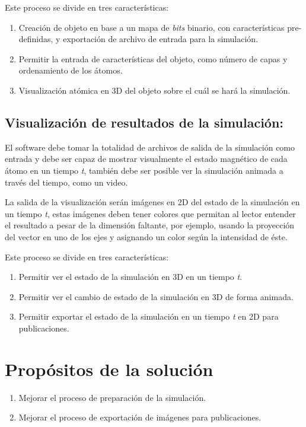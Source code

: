 Este proceso se divide en tres características:

\begin{enumerate}
	\item Creación de objeto en base a un mapa de \emph{bits} binario, con características pre-definidas, y exportación de archivo de entrada para la simulación.
	\item Permitir la entrada de características del objeto, como número de capas y ordenamiento de los átomos.
	\item Visualización atómica en 3D del objeto sobre el cuál se hará la simulación.
\end{enumerate}

\subsection{Visualización de resultados de la simulación:}

El software debe tomar la totalidad de archivos de salida de la simulación como entrada y debe ser capaz de mostrar visualmente el estado magnético de cada átomo en un tiempo \emph{t}, también debe ser posible ver la simulación animada a través del tiempo, como un video.

La salida de la visualización serán imágenes en 2D del estado de la simulación en un tiempo \emph{t}, estas imágenes deben tener colores que permitan al lector entender el resultado a pesar de la dimensión faltante, por ejemplo, usando la proyección del vector en uno de los ejes y asignando un color según la intensidad de éste.

Este proceso se divide en tres características:

\begin{enumerate}
	\item Permitir ver el estado de la simulación en 3D en un tiempo \emph{t}.
	\item Permitir ver el cambio de estado de la simulación en 3D de forma animada.
	\item Permitir exportar el estado de la simulación en un tiempo \emph{t} en 2D para publicaciones.
\end{enumerate}


\section{Propósitos de la solución}
\begin{enumerate}
  \item Mejorar el proceso de preparación de la simulación.
  \item Mejorar el proceso de exportación de imágenes para publicaciones.
\end{enumerate}


